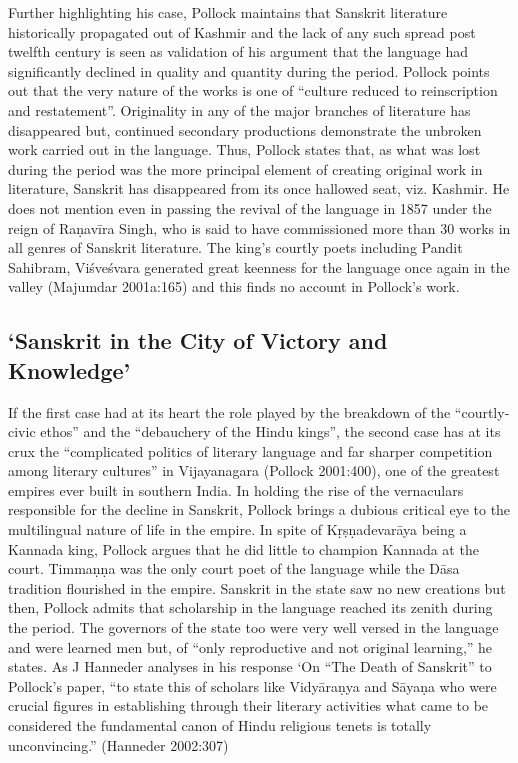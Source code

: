 Further highlighting his case, Pollock maintains that Sanskrit literature historically propagated out of Kashmir and the lack of any such spread post twelfth century is seen as validation of his argument that the language had significantly declined in quality and quantity during the period. Pollock points out that the very nature of the works is one of “culture reduced to reinscription and restatement”. Originality in any of the major branches of literature has disappeared but, continued secondary productions demonstrate the unbroken work carried out in the language. Thus, Pollock states that, as what was lost during the period was the more principal element of creating original work in literature, Sanskrit has disappeared from its once hallowed seat, viz. Kashmir. He does not mention even in passing the revival of the language in 1857 under the reign of Raṇavīra Singh, who is said to have commissioned more than 30 works in all genres of Sanskrit literature. The king’s courtly poets including Pandit Sahibram, Viśveśvara generated great keenness for the language once again in the valley (Majumdar 2001a:165) and this finds no account in Pollock’s work.

\subsection{‘Sanskrit in the City of Victory and Knowledge’}

If the first case had at its heart the role played by the breakdown of the “courtly-civic ethos” and the “debauchery of the Hindu kings”, the second case has at its crux the “complicated politics of literary language and far sharper competition among literary cultures” in Vijayanagara (Pollock 2001:400), one of the greatest empires ever built in southern India. In holding the rise of the vernaculars responsible for the decline in Sanskrit, Pollock brings a dubious critical eye to the multilingual nature of life in the empire. In spite of Kṛṣṇadevarāya being a Kannada king, Pollock argues that he did little to champion Kannada at the court. Timmaṇṇa was the only court poet of the language while the Dāsa tradition flourished in the empire. Sanskrit in the state saw no new creations but then, Pollock admits that scholarship in the language reached its zenith during the period. The governors of the state too were very well versed in the language and were learned men but, of “only reproductive and not original learning,” he states. As J Hanneder analyses in his response ‘On “The Death of Sanskrit” to Pollock’s paper, “to state this of scholars like Vidyāraṇya and Sāyaṇa who were crucial figures in establishing through their literary activities what came to be considered the fundamental canon of Hindu religious tenets is totally unconvincing.” (Hanneder 2002:307)


